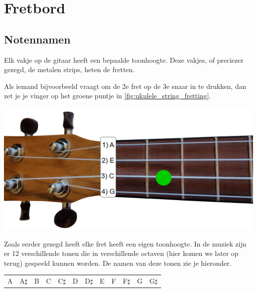 \section{Fretbord}

\subsection{Notennamen}

\begin{minipage}[b]{0.48\textwidth}
Elk vakje op de gitaar heeft een bepaalde toonhoogte. Deze vakjes, of preciezer gezegd, de metalen strips, heten de fretten.

Als iemand bijvoorbeeld vraagt om de 2e fret op de 3e snaar in te drukken, dan zet je je vinger op het groene puntje in \ref{fig:ukulele_string_fretting}.
\end{minipage}
\hfill
\begin{minipage}{0.48\textwidth}
    \centering
    \includegraphics[width=\textwidth]{image/ukulele-neck-fretting.png}
    \label{fig:ukulele_string_fretting}
\end{minipage}

Zoals eerder gezegd heeft elke fret heeft een eigen toonhoogte. In de muziek zijn er 12 verschillende tonen die in verschillende octaven (hier komen we later op terug) gespeeld kunnen worden. De namen van deze tonen zie je hieronder.

\begin{table}[h]
\centering
\begin{tabular}{*{12}{P{5mm}}}
\large{A} & \large{A$\sharp$} & \large{B} & \large{C} & \large{C$\sharp$} & \large{D} & \large{D$\sharp$} & \large{E} & \large{F} & \large{F$\sharp$} & \large{G} & \large{G$\sharp$}
\end{tabular}
\end{table}

